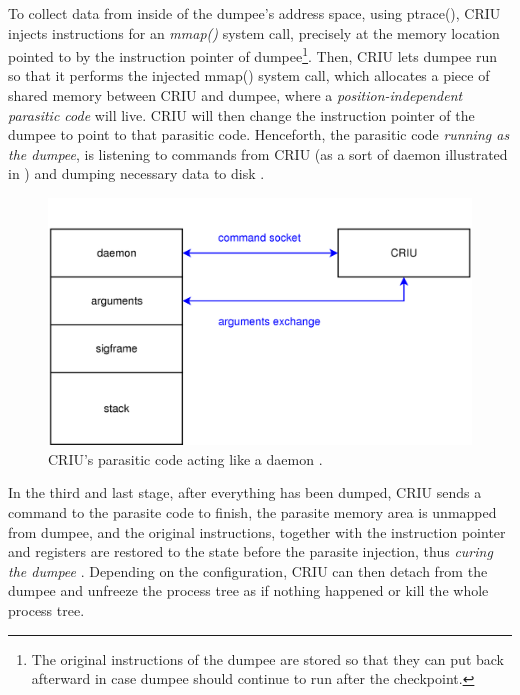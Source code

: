 \documentclass[
  digital,     %
  oneside,     %
  nosansbold,  %
  nocolorbold, %
  lof,         %
  nolot,         %
]{fithesis4}
\begin{document}
To collect data from inside of the dumpee's address space, using ptrace(), CRIU injects instructions for an \emph{mmap()} system call, precisely at the memory location pointed to by the instruction pointer of dumpee\footnote{The original instructions of the dumpee are stored so that they can put back afterward in case dumpee should continue to run after the checkpoint.}. Then, CRIU lets dumpee run so that it performs the injected mmap() system call, which allocates a piece of shared memory between CRIU and dumpee, where a \emph{position-independent parasitic code} will live. CRIU will then change the instruction pointer of the dumpee to point to that parasitic code. Henceforth, the parasitic code \emph{running as the dumpee}, is listening to commands from CRIU (as a sort of daemon illustrated in ) and dumping necessary data to disk \cite{criu_parasite}.

\begin{figure}[H]
  \begin{center}
  \includegraphics[width=\textwidth]{figures/criu-parasite-daemon.png}
  \end{center}
  \caption{CRIU's parasitic code acting like a daemon \cite{criu_parasite}.}
  \label{fig:parasite-daemon}
\end{figure}

In the third and last stage, after everything has been dumped, CRIU sends a command to the parasite code to finish, the parasite memory area is unmapped from dumpee, and the original instructions, together with the instruction pointer and registers are restored to the state before the parasite injection, thus \emph{curing the dumpee} \cite{criu_parasite}. Depending on the configuration, CRIU can then detach from the dumpee and unfreeze the process tree as if nothing happened or kill the whole process tree.
\end{document}
